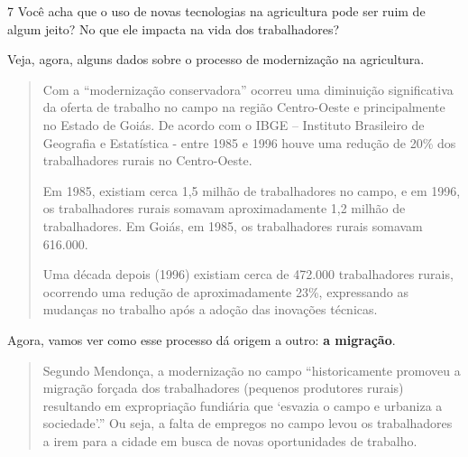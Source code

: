 \num{7} Você acha que o uso de novas tecnologias na agricultura pode ser ruim de
algum jeito? No que ele impacta na vida dos trabalhadores?


Veja, agora, alguns dados sobre o processo de modernização na agricultura.

\begin{quote}
Com a “modernização conservadora” ocorreu uma diminuição significativa
da oferta de trabalho no campo na região Centro-Oeste e principalmente
no Estado de Goiás. De acordo com o IBGE – Instituto Brasileiro de
Geografia e Estatística - entre 1985 e 1996 houve uma redução de 20\%
dos trabalhadores rurais no Centro-Oeste.

Em 1985, existiam cerca 1,5 milhão de trabalhadores no campo, e em 1996,
os trabalhadores rurais somavam aproximadamente 1,2 milhão de
trabalhadores. Em Goiás, em 1985, os trabalhadores rurais somavam
616.000.

Uma década depois (1996) existiam cerca de 472.000 trabalhadores rurais,
ocorrendo uma redução de aproximadamente 23\%, expressando as mudanças
no trabalho após a adoção das inovações técnicas.

\end{quote}

\pagebreak

Agora, vamos ver como esse processo dá origem a outro: \textbf{a migração}.

\begin{quote}
Segundo Mendonça, a modernização no campo “historicamente promoveu a
migração forçada dos trabalhadores (pequenos produtores rurais)
resultando em expropriação fundiária que `esvazia o campo e urbaniza a
sociedade'.” Ou seja, a falta de empregos no campo levou os
trabalhadores a irem para a cidade em busca de novas oportunidades de
trabalho.

\end{quote}

